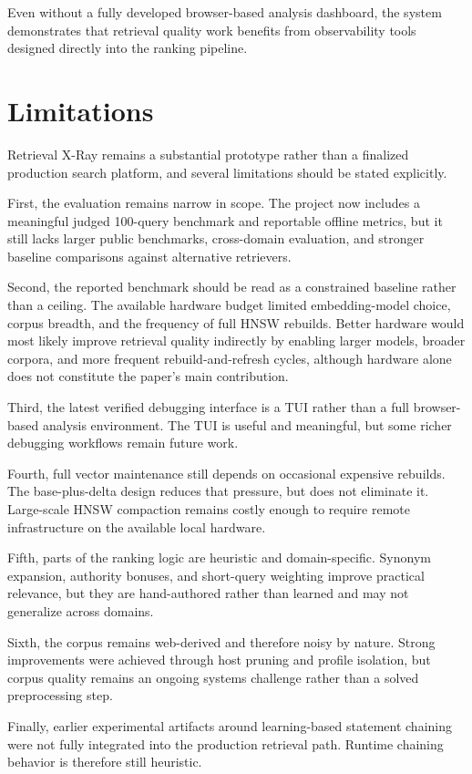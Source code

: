 \documentclass[conference]{IEEEtran}
\newcommand{\system}{Retrieval X-Ray\xspace}
\begin{document}
Even without a fully developed browser-based analysis dashboard, the system demonstrates that retrieval quality work benefits from observability tools designed directly into the ranking pipeline.

\section{Limitations}
\system remains a substantial prototype rather than a finalized production search platform, and several limitations should be stated explicitly.

First, the evaluation remains narrow in scope. The project now includes a meaningful judged 100-query benchmark and reportable offline metrics, but it still lacks larger public benchmarks, cross-domain evaluation, and stronger baseline comparisons against alternative retrievers.

Second, the reported benchmark should be read as a constrained baseline rather than a ceiling. The available hardware budget limited embedding-model choice, corpus breadth, and the frequency of full HNSW rebuilds. Better hardware would most likely improve retrieval quality indirectly by enabling larger models, broader corpora, and more frequent rebuild-and-refresh cycles, although hardware alone does not constitute the paper's main contribution.

Third, the latest verified debugging interface is a TUI rather than a full browser-based analysis environment. The TUI is useful and meaningful, but some richer debugging workflows remain future work.

Fourth, full vector maintenance still depends on occasional expensive rebuilds. The base-plus-delta design reduces that pressure, but does not eliminate it. Large-scale HNSW compaction remains costly enough to require remote infrastructure on the available local hardware.

Fifth, parts of the ranking logic are heuristic and domain-specific. Synonym expansion, authority bonuses, and short-query weighting improve practical relevance, but they are hand-authored rather than learned and may not generalize across domains.

Sixth, the corpus remains web-derived and therefore noisy by nature. Strong improvements were achieved through host pruning and profile isolation, but corpus quality remains an ongoing systems challenge rather than a solved preprocessing step.

Finally, earlier experimental artifacts around learning-based statement chaining were not fully integrated into the production retrieval path. Runtime chaining behavior is therefore still heuristic.
\end{document}
